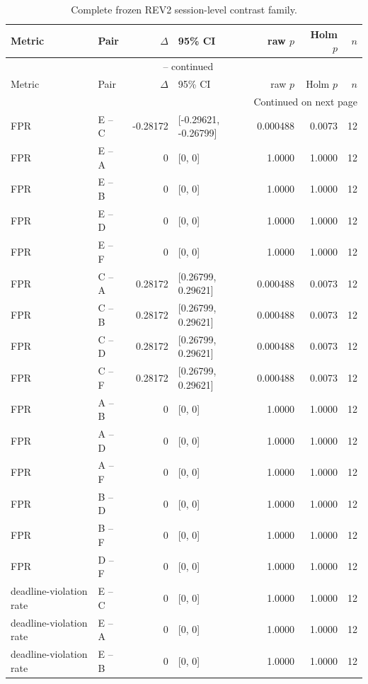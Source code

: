\documentclass[10pt]{article}
\begin{document}
\setlength{\LTpre}{4pt}\setlength{\LTpost}{4pt}
\scriptsize
\setlength{\tabcolsep}{3pt}
\begin{longtable}{@{}p{}p{}r p{}rrr@{}}
\caption{Complete frozen REV2 session-level contrast family.}\label{tab:allcontrasts}\\
\toprule
Metric & Pair & $\Delta$ & 95\% CI & raw $p$ & Holm $p$ & $n$ \\
\midrule
\endfirsthead
\multicolumn{7}{c}{\tablename\ \thetable{} -- continued}\\
\toprule
Metric & Pair & $\Delta$ & 95\% CI & raw $p$ & Holm $p$ & $n$ \\
\midrule
\endhead
\midrule
\multicolumn{7}{r}{Continued on next page}\\
\endfoot
\bottomrule
\endlastfoot
FPR & E -- C & -0.28172 & [-0.29621, -0.26799] & 0.000488 & 0.0073 & 12 \\
FPR & E -- A & 0 & [0, 0] & 1.0000 & 1.0000 & 12 \\
FPR & E -- B & 0 & [0, 0] & 1.0000 & 1.0000 & 12 \\
FPR & E -- D & 0 & [0, 0] & 1.0000 & 1.0000 & 12 \\
FPR & E -- F & 0 & [0, 0] & 1.0000 & 1.0000 & 12 \\
FPR & C -- A & 0.28172 & [0.26799, 0.29621] & 0.000488 & 0.0073 & 12 \\
FPR & C -- B & 0.28172 & [0.26799, 0.29621] & 0.000488 & 0.0073 & 12 \\
FPR & C -- D & 0.28172 & [0.26799, 0.29621] & 0.000488 & 0.0073 & 12 \\
FPR & C -- F & 0.28172 & [0.26799, 0.29621] & 0.000488 & 0.0073 & 12 \\
FPR & A -- B & 0 & [0, 0] & 1.0000 & 1.0000 & 12 \\
FPR & A -- D & 0 & [0, 0] & 1.0000 & 1.0000 & 12 \\
FPR & A -- F & 0 & [0, 0] & 1.0000 & 1.0000 & 12 \\
FPR & B -- D & 0 & [0, 0] & 1.0000 & 1.0000 & 12 \\
FPR & B -- F & 0 & [0, 0] & 1.0000 & 1.0000 & 12 \\
FPR & D -- F & 0 & [0, 0] & 1.0000 & 1.0000 & 12 \\
deadline-violation rate & E -- C & 0 & [0, 0] & 1.0000 & 1.0000 & 12 \\
deadline-violation rate & E -- A & 0 & [0, 0] & 1.0000 & 1.0000 & 12 \\
deadline-violation rate & E -- B & 0 & [0, 0] & 1.0000 & 1.0000 & 12 \\

\end{longtable}
\end{document}
